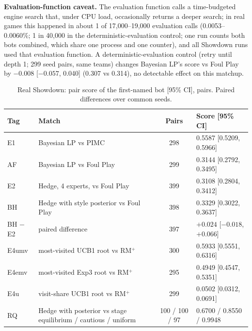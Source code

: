 \documentclass[10pt]{article}
\theoremstyle{plain}
\theoremstyle{definition}
\theoremstyle{remark}
\begin{document}
\textbf{Evaluation-function caveat.} The evaluation function calls a time-budgeted engine search that, under CPU load, occasionally returns a deeper search; in real games this happened in about 1 of 17,000--19,000 evaluation calls (0.0053--0.0060\%; 1 in 40,000 in the deterministic-evaluation control; one run counts both bots combined, which share one process and one counter), and all Showdown runs used that evaluation function.
A deterministic-evaluation control (retry until depth 1; 299 seed pairs, same teams) changes Bayesian LP's score vs Foul Play by $-0.008$ [$-0.057$, 0.040] (0.307 vs 0.314), no detectable effect on this matchup.

\begin{table}[h]
\centering\small
\caption{Real Showdown: pair score of the first-named bot [95\% CI], pairs. Paired differences over common seeds.}
\label{tab:showdown}
\begin{tabular}{@{}llcl@{}}
\toprule
Tag & Match & Pairs & Score [95\% CI] \\
\midrule
E1 & Bayesian LP vs PIMC & 298 & 0.5587 [0.5209, 0.5966] \\
AF & Bayesian LP vs Foul Play & 299 & 0.3144 [0.2792, 0.3495] \\
E2 & Hedge, 4 experts, vs Foul Play & 399 & 0.3108 [0.2804, 0.3412] \\
BH & Hedge with style posterior vs Foul Play & 398 & 0.3329 [0.3022, 0.3637] \\
BH $-$ E2 & paired difference & 397 & $+0.024$ [$-0.018$, $+0.066$] \\
E4umv & most-visited UCB1 root vs RM$^+$ & 300 & 0.5933 [0.5551, 0.6316] \\
E4emv & most-visited Exp3 root vs RM$^+$ & 295 & 0.4949 [0.4547, 0.5351] \\
E4u & visit-share UCB1 root vs RM$^+$ & 299 & 0.0502 [0.0312, 0.0691] \\
RQ & Hedge with posterior vs stage equilibrium / cautious / uniform & 100 / 100 / 97 & 0.6700 / 0.8550 / 0.9948 \\
\bottomrule
\end{tabular}
\vspace{-0.6em}
\end{table}
\end{document}
